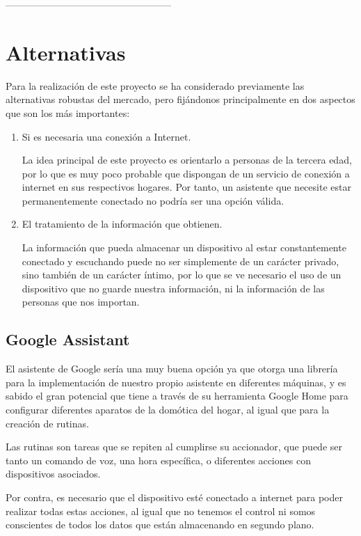---------------------------------------------------

\section{Alternativas}

Para la realización de este proyecto se ha considerado previamente las alternativas robustas del mercado, pero fijándonos principalmente en dos aspectos que son los más importantes:
 \begin{enumerate}
     \item Si es necesaria una conexión a Internet.
     
La idea principal de este proyecto es orientarlo a personas de la tercera edad, por lo que es muy poco probable que dispongan de un servicio de conexión a internet en sus respectivos hogares. Por tanto, un asistente que necesite estar permanentemente conectado no podría ser una opción válida.
    \item El tratamiento de la información que obtienen.

La información que pueda almacenar un dispositivo al estar constantemente conectado y escuchando puede no ser simplemente de un carácter privado, sino también de un carácter íntimo, por lo que se ve necesario el uso de un dispositivo que no guarde nuestra información, ni la información de las personas que nos importan.

 \end{enumerate}

\subsection{Google Assistant}

El asistente de Google sería una muy buena opción ya que otorga una librería para la implementación de nuestro propio asistente en diferentes máquinas, y es sabido el gran potencial que tiene a través de su herramienta Google Home para configurar diferentes aparatos de la domótica del hogar, al igual que para la creación de rutinas.

Las rutinas son tareas que se repiten al cumplirse su accionador, que puede ser tanto un comando de voz, una hora específica, o diferentes acciones con dispositivos asociados.

Por contra, es necesario que el dispositivo esté conectado a internet para poder realizar todas estas acciones, al igual que no tenemos el control ni somos conscientes de todos los datos que están almacenando en segundo plano.

